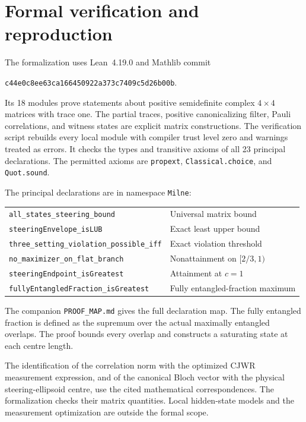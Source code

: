 \documentclass[11pt]{article}
\begin{document}
\section{Formal verification and reproduction}\label{sec:formal}
The formalization uses Lean~4.19.0 and Mathlib commit
\begin{center}\small\texttt{c44e0c8ee63ca166450922a373c7409c5d26b00b}.\end{center}
Its 18 modules prove statements about positive semidefinite complex $4\times4$ matrices with trace one. The partial traces, positive canonicalizing filter, Pauli correlations, and witness states are explicit matrix constructions. The verification script rebuilds every local module with compiler trust level zero and warnings treated as errors. It checks the types and transitive axioms of all 23 principal declarations. The permitted axioms are \texttt{propext}, \texttt{Classical.choice}, and \texttt{Quot.sound}.

The principal declarations are in namespace \texttt{Milne}:
\begin{center}\small
\begin{tabular}{@{}ll@{}}
\texttt{all\_states\_steering\_bound} & Universal matrix bound\\
\texttt{steeringEnvelope\_isLUB} & Exact least upper bound\\
\texttt{three\_setting\_violation\_possible\_iff} & Exact violation threshold\\
\texttt{no\_maximizer\_on\_flat\_branch} & Nonattainment on $[2/3,1)$\\
\texttt{steeringEndpoint\_isGreatest} & Attainment at $c=1$\\
\texttt{fullyEntangledFraction\_isGreatest} & Fully entangled-fraction maximum
\end{tabular}
\end{center}
The companion \texttt{PROOF\_MAP.md} gives the full declaration map. The fully entangled fraction is defined as the supremum over the actual maximally entangled overlaps. The proof bounds every overlap and constructs a saturating state at each centre length.

The identification of the correlation norm with the optimized CJWR measurement expression, and of the canonical Bloch vector with the physical steering-ellipsoid centre, use the cited mathematical correspondences. The formalization checks their matrix quantities. Local hidden-state models and the measurement optimization are outside the formal scope.
\end{document}
